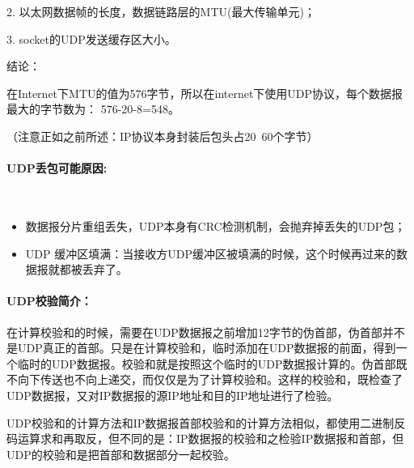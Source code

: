 \documentclass[UTF8]{article}%
\begin{document}
2. 以太网数据帧的长度，数据链路层的MTU(最大传输单元)；

3. socket的UDP发送缓存区大小。

结论：

在Internet下MTU的值为576字节，所以在internet下使用UDP协议，每个数据报最大的字节数为： 576-20-8=548。

（注意正如之前所述：IP协议本身封装后包头占20~60个字节）

\paragraph{UDP丢包可能原因:}~{}

\begin{itemize}
    \item 数据报分片重组丢失，UDP本身有CRC检测机制，会抛弃掉丢失的UDP包；
    \item UDP 缓冲区填满：当接收方UDP缓冲区被填满的时候，这个时候再过来的数据报就都被丢弃了。
\end{itemize}

\paragraph{UDP校验简介：}

在计算校验和的时候，需要在UDP数据报之前增加12字节的伪首部，伪首部并不是UDP真正的首部。只是在计算校验和，临时添加在UDP数据报的前面，得到一个临时的UDP数据报。校验和就是按照这个临时的UDP数据报计算的。伪首部既不向下传送也不向上递交，而仅仅是为了计算校验和。这样的校验和，既检查了UDP数据报，又对IP数据报的源IP地址和目的IP地址进行了检验。

UDP校验和的计算方法和IP数据报首部校验和的计算方法相似，都使用二进制反码运算求和再取反，但不同的是：IP数据报的校验和之检验IP数据报和首部，但UDP的校验和是把首部和数据部分一起校验。
\end{document}
